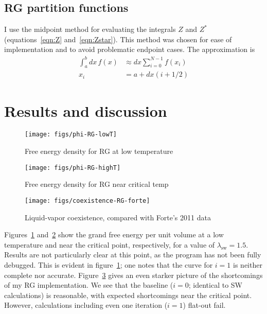 \documentclass[letterpaper,twocolumn,amsmath,amssymb,prb]{revtex4-1}
\newcommand{\lambdaSW}{\ensuremath{\lambda_\text{sw}}}
\begin{document}
\subsection{RG partition functions}\label{subsec:fbar-ubar}
I use the midpoint method for evaluating the integrals $Z$ and $Z^*$
(equations~\ref{eqn:Z} and~\ref{eqn:Zstar}). This method was chosen
for ease of implementation and to avoid problematic endpoint
cases. The approximation is
\begin{align}
  \int_a^b dx\, f(x) &\approx dx\sum_{i=0}^{N-1} f(x_i) \\
  x_i &= a + dx(i+1/2)
\end{align}

\section{Results and discussion}\label{sec:results}

\begin{figure}
  \begin{center}
  \texttt{[image: figs/phi-RG-lowT]}
  \end{center}
  \caption{Free energy density for RG at low temperature}
  \label{fig:phi-RG-lowT}
\end{figure}

\begin{figure}
  \begin{center}
  \texttt{[image: figs/phi-RG-highT]}
  \end{center}
  \caption{Free energy density for RG near critical temp}
  \label{fig:phi-RG-highT}
\end{figure}

\begin{figure}
  \begin{center}
  \texttt{[image: figs/coexistence-RG-forte]}
  \end{center}
  \caption{Liquid-vapor coexistence, compared with Forte's 2011 data}
  \label{fig:coexistence-RG-forte}
\end{figure}

Figures~\ref{fig:phi-RG-lowT} and~\ref{fig:phi-RG-highT} show the
grand free energy per unit volume at a low temperature and near the
critical point, respectively, for a value of $\lambdaSW = 1.5$. Results are not particularly clear at
this point, as the program has not been fully debugged. This is
evident in figure~\ref{fig:phi-RG-lowT}; one notes that the curve for
$i=1$ is neither complete nor
accurate. Figure~\ref{fig:coexistence-RG-forte} gives an even starker
picture of the shortcomings of my RG implementation. We see that the
baseline ($i=0$; identical to SW calculations) is reasonable, with
expected shortcomings near the critical point. However, calculations
including even one iteration ($i=1$) flat-out fail.
\end{document}
